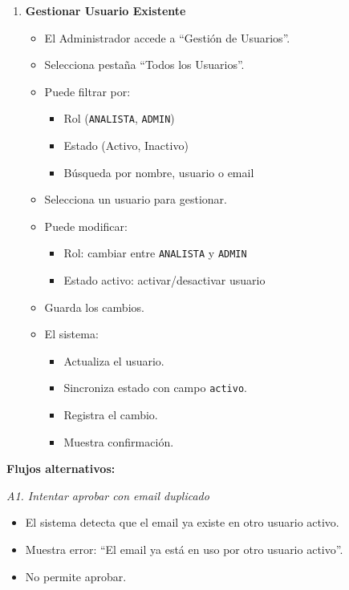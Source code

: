 \begin{enumerate}[nosep]
    \item \textbf{Gestionar Usuario Existente}
    \begin{itemize}[nosep]
        \item El Administrador accede a ``Gestión de Usuarios''.
        \item Selecciona pestaña ``Todos los Usuarios''.
        \item Puede filtrar por:
        \begin{itemize}[nosep]
            \item Rol (\texttt{ANALISTA}, \texttt{ADMIN})
            \item Estado (Activo, Inactivo)
            \item Búsqueda por nombre, usuario o email
        \end{itemize}
        \item Selecciona un usuario para gestionar.
        \item Puede modificar:
        \begin{itemize}[nosep]
            \item Rol: cambiar entre \texttt{ANALISTA} y \texttt{ADMIN}
            \item Estado activo: activar/desactivar usuario
        \end{itemize}
        \item Guarda los cambios.
        \item El sistema:
        \begin{itemize}[nosep]
            \item Actualiza el usuario.
            \item Sincroniza estado con campo \texttt{activo}.
            \item Registra el cambio.
            \item Muestra confirmación.
        \end{itemize}
    \end{itemize}
\end{enumerate}

\vspace{0.5em}
\noindent\textbf{Flujos alternativos:}

\vspace{0.3em}
\noindent\textit{A1. Intentar aprobar con email duplicado}
\begin{itemize}[nosep]
    \item El sistema detecta que el email ya existe en otro usuario activo.
    \item Muestra error: ``El email ya está en uso por otro usuario activo''.
    \item No permite aprobar.
\end{itemize}

